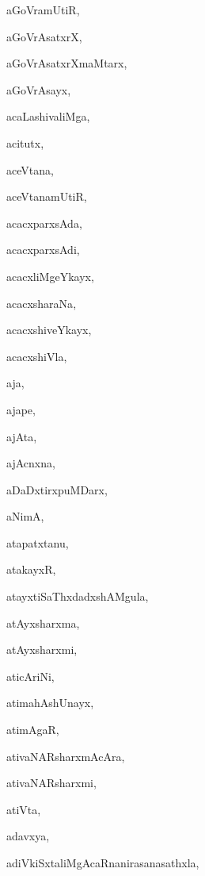\begin{multicols}{2}
{aGoVramUtiR}, \pageref{aGoVramUtiR}

{aGoVrAsatxrX}, \pageref{aGoVrAsatxrX}

{aGoVrAsatxrXmaMtarx}, \pageref{aGoVrAsatxrXmaMtarx}

{aGoVrAsayx}, \pageref{aGoVrAsayx}

{acaLashivaliMga}, \pageref{acaLashivaliMga}

{acitutx}, \pageref{acitutx}

{aceVtana}, \pageref{aceVtana}

{aceVtanamUtiR}, \pageref{aceVtanamUtiR}

{acacxparxsAda}, \pageref{acacxparxsAda}

{acacxparxsAdi}, \pageref{acacxparxsAdi}

{acacxliMgeYkayx}, \pageref{acacxliMgeYkayx}

{acacxsharaNa}, \pageref{acacxsharaNa}

{acacxshiveYkayx}, \pageref{acacxshiveYkayx}

{acacxshiVla}, \pageref{acacxshiVla}

{aja}, \pageref{aja}

{ajape}, \pageref{ajape}

{ajAta}, \pageref{ajAta}

{ajAcnxna}, \pageref{ajAcnxna}

{aDaDxtirxpuMDarx}, \pageref{aDaDxtirxpuMDarx}

{aNimA}, \pageref{aNimA}

{atapatxtanu}, \pageref{atapatxtanu}

{atakayxR}, \pageref{atakayxR}

{atayxtiSaThxdadxshAMgula}, \pageref{atayxtiSaThxdadxshAMgula}

{atAyxsharxma}, \pageref{atAyxsharxma}

{atAyxsharxmi}, \pageref{atAyxsharxmi}

{aticAriNi}, \pageref{aticAriNi}

{atimahAshUnayx}, \pageref{atimahAshUnayx}

{atimAgaR}, \pageref{atimAgaR}

{ativaNARsharxmAcAra}, \pageref{ativaNARsharxmAcAra}

{ativaNARsharxmi}, \pageref{ativaNARsharxmi}

{atiVta}, \pageref{atiVta}

{adavxya}, \pageref{adavxya}

{adiVkiSxtaliMgAcaRnanirasanasathxla}, \pageref{adiVkiSxtaliMgAcaRnanirasanasathxla}


\end{multicols}
